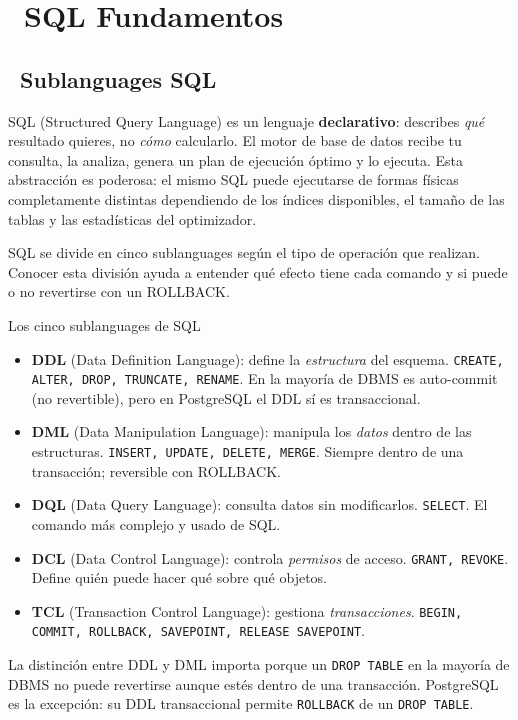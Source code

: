 \chapter[SQL Fundamentos]{~SQL Fundamentos}

\section[Sublanguages SQL]{~Sublanguages SQL}

SQL (Structured Query Language) es un lenguaje \textbf{declarativo}: describes \emph{qué} resultado quieres, no \emph{cómo} calcularlo.
El motor de base de datos recibe tu consulta, la analiza, genera un plan de ejecución óptimo y lo ejecuta.
Esta abstracción es poderosa: el mismo SQL puede ejecutarse de formas físicas completamente distintas dependiendo de los índices disponibles, el tamaño de las tablas y las estadísticas del optimizador.

SQL se divide en cinco sublanguages según el tipo de operación que realizan.
Conocer esta división ayuda a entender qué efecto tiene cada comando y si puede o no revertirse con un ROLLBACK.

\begin{teoriabox}{Los cinco sublanguages de SQL}
\begin{itemize}
  \item \textbf{DDL} (Data Definition Language): define la \emph{estructura} del esquema.
    \texttt{CREATE, ALTER, DROP, TRUNCATE, RENAME}. En la mayoría de DBMS es auto-commit (no revertible), pero en PostgreSQL el DDL sí es transaccional.
  \item \textbf{DML} (Data Manipulation Language): manipula los \emph{datos} dentro de las estructuras.
    \texttt{INSERT, UPDATE, DELETE, MERGE}. Siempre dentro de una transacción; reversible con ROLLBACK.
  \item \textbf{DQL} (Data Query Language): consulta datos sin modificarlos.
    \texttt{SELECT}. El comando más complejo y usado de SQL.
  \item \textbf{DCL} (Data Control Language): controla \emph{permisos} de acceso.
    \texttt{GRANT, REVOKE}. Define quién puede hacer qué sobre qué objetos.
  \item \textbf{TCL} (Transaction Control Language): gestiona \emph{transacciones}.
    \texttt{BEGIN, COMMIT, ROLLBACK, SAVEPOINT, RELEASE SAVEPOINT}.
\end{itemize}
La distinción entre DDL y DML importa porque un \texttt{DROP TABLE} en la mayoría de DBMS no puede revertirse aunque estés dentro de una transacción. PostgreSQL es la excepción: su DDL transaccional permite \texttt{ROLLBACK} de un \texttt{DROP TABLE}.
\end{teoriabox}

